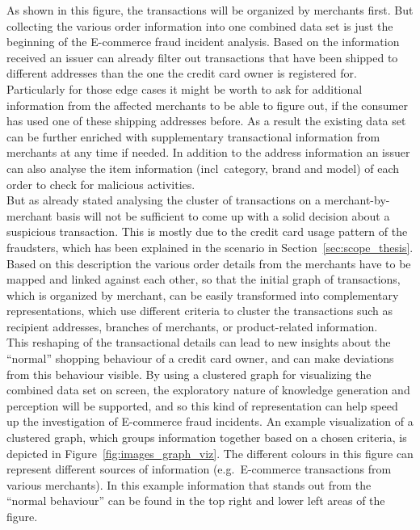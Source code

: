 As shown in this figure, the transactions will be organized by merchants first. But collecting the various order information into one combined data set is just the beginning of the \gls{E-commerce} fraud incident analysis. Based on the information received an issuer can already filter out transactions that have been shipped to different addresses than the one the credit card owner is registered for. Particularly for those edge cases it might be worth to ask for additional information from the affected merchants to be able to figure out, if the consumer has used one of these shipping addresses before. As a result the existing data set can be further enriched with supplementary transactional information from merchants at any time if needed. In addition to the address information an issuer can also analyse the item information (\gls{incl}\ category, brand and model) of each order to check for malicious activities. \\

But as already stated analysing the cluster of transactions on a merchant-by-merchant basis will not be sufficient to come up with a solid decision about a suspicious transaction. This is mostly due to the credit card usage pattern of the fraudsters, which has been explained in the scenario in Section~\ref{sec:scope_thesis}. Based on this description the various order details from the merchants have to be mapped and linked against each other, so that the initial graph of transactions, which is organized by merchant, can be easily transformed into complementary representations, which use different criteria to cluster the transactions such as recipient addresses, branches of merchants, or product-related information. \\

This reshaping of the transactional details can lead to new insights about the ``normal'' shopping behaviour of a credit card owner, and can make deviations from this behaviour visible. By using a clustered graph for visualizing the combined data set on screen, the exploratory nature of knowledge generation and perception will be supported, and so this kind of representation can help speed up the investigation of \gls{E-commerce} fraud incidents. An example visualization of a clustered graph, which groups information together based on a chosen criteria, is depicted in Figure~\ref{fig:images_graph_viz}. The different colours in this figure can represent different sources of information (e.g.\ \gls{E-commerce} transactions from various merchants). In this example information that stands out from the ``normal behaviour'' can be found in the top right and lower left areas of the figure. \@

